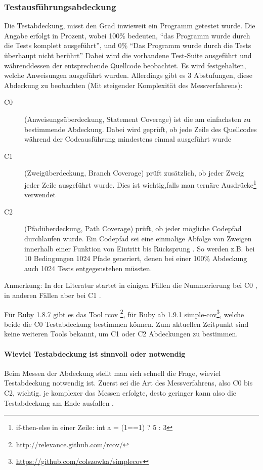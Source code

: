 \subsubsection{Testausführungsabdeckung}
Die Testabdeckung, misst den Grad inwieweit ein Programm getestet wurde. Die Angabe erfolgt in Prozent, wobei 100\% bedeuten, "`das Programm wurde durch die Tests komplett ausgeführt"', und 0\% "`Das Programm wurde durch die Tests überhaupt nicht berührt"' Dabei wird die vorhandene Test-Suite ausgeführt und währenddessen der entsprechende Quellcode beobachtet. Es wird festgehalten, welche Anweisungen ausgeführt wurden. Allerdings gibt es 3 Abstufungen, diese Abdeckung zu beobachten (Mit steigender Komplexität des Messverfahrens):
\begin{description}
 \item[C0] (Anweisungsüberdeckung, Statement Coverage) ist die am einfachsten zu bestimmende Abdeckung. Dabei wird geprüft, ob jede Zeile des Quellcodes während der Codeausführung mindestens einmal ausgeführt wurde
 \item[C1] (Zweigüberdeckung, Branch Coverage) prüft zusätzlich, ob jeder Zweig jeder Zeile ausgeführt wurde. Dies ist wichtig,falls man ternäre Ausdrücke\footnote{if-then-else in einer Zeile: int a = (1==1) ? 5 : 3} verwendet
 \item[C2] (Pfadüberdeckung, Path Coverage) prüft, ob jeder mögliche Codepfad durchlaufen wurde. Ein Codepfad sei eine einmalige Abfolge von Zweigen innerhalb einer Funktion von Eintritt bis Rücksprung \citep{steve_cornett_code_1996}. So werden z.B. bei 10 Bedingungen 1024 Pfade generiert, denen bei einer 100\% Abdeckung auch 1024 Tests entgegenstehen müssten.
 \end{description}
 Anmerkung: In der Literatur startet in einigen Fällen die Nummerierung bei C0 \citep{catherine_powell_abakas_2008}, in anderen Fällen aber bei C1 \citep{steve_cornett_code_1996}.
 
 Für Ruby 1.8.7 gibt es das Tool rcov \footnote{\url{http://relevance.github.com/rcov/}}, für Ruby ab 1.9.1 simple-cov\footnote{\url{https://github.com/colszowka/simplecov}}, welche beide die C0 Testabdeckung bestimmen können. Zum aktuellen Zeitpunkt sind keine weiteren Tools bekannt, um C1 oder C2 Abdeckungen zu bestimmen.
 \paragraph{Wieviel Testabdeckung ist sinnvoll oder notwendig}
 
 Beim Messen der Abdeckung stellt man sich schnell die Frage, wieviel Testabdeckung notwendig ist. Zuerst sei die Art des Messverfahrens, also C0 bis C2, wichtig. je komplexer das Messen erfolgte, desto geringer kann also die Testabdeckung am Ende ausfallen \citep{catherine_powell_abakas_2008}.
 
